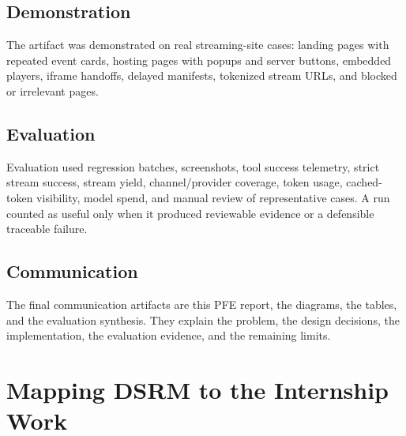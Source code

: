 \subsection{Demonstration}

The artifact was demonstrated on real streaming-site cases: landing pages with
repeated event cards, hosting pages with popups and server buttons, embedded
players, iframe handoffs, delayed manifests, tokenized stream URLs, and blocked
or irrelevant pages.

\subsection{Evaluation}

Evaluation used regression batches, screenshots, tool success telemetry,
strict stream success, stream yield, channel/provider coverage, token usage,
cached-token visibility, model spend, and manual review of representative
cases. A run counted as useful only when it produced reviewable evidence or a
defensible traceable failure.

\subsection{Communication}

The final communication artifacts are this PFE report, the diagrams, the
tables, and the evaluation synthesis. They explain the problem, the design
decisions, the implementation, the evaluation evidence, and the remaining
limits.



\section{Mapping DSRM to the Internship Work}

